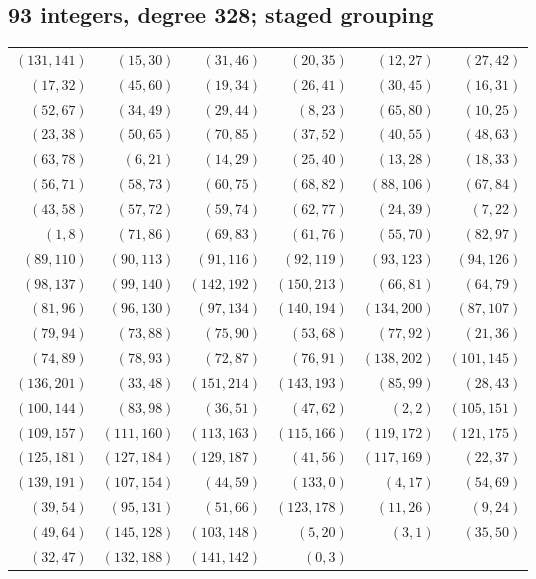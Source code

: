 \subsection*{93 integers, degree 328; staged grouping}
\begingroup\small
\begin{longtable}{rrrrrr}
$(131,141)$ & $(15,30)$ & $(31,46)$ & $(20,35)$ & $(12,27)$ & $(27,42)$\\
$(17,32)$ & $(45,60)$ & $(19,34)$ & $(26,41)$ & $(30,45)$ & $(16,31)$\\
$(52,67)$ & $(34,49)$ & $(29,44)$ & $(8,23)$ & $(65,80)$ & $(10,25)$\\
$(23,38)$ & $(50,65)$ & $(70,85)$ & $(37,52)$ & $(40,55)$ & $(48,63)$\\
$(63,78)$ & $(6,21)$ & $(14,29)$ & $(25,40)$ & $(13,28)$ & $(18,33)$\\
$(56,71)$ & $(58,73)$ & $(60,75)$ & $(68,82)$ & $(88,106)$ & $(67,84)$\\
$(43,58)$ & $(57,72)$ & $(59,74)$ & $(62,77)$ & $(24,39)$ & $(7,22)$\\
$(1,8)$ & $(71,86)$ & $(69,83)$ & $(61,76)$ & $(55,70)$ & $(82,97)$\\
$(89,110)$ & $(90,113)$ & $(91,116)$ & $(92,119)$ & $(93,123)$ & $(94,126)$\\
$(98,137)$ & $(99,140)$ & $(142,192)$ & $(150,213)$ & $(66,81)$ & $(64,79)$\\
$(81,96)$ & $(96,130)$ & $(97,134)$ & $(140,194)$ & $(134,200)$ & $(87,107)$\\
$(79,94)$ & $(73,88)$ & $(75,90)$ & $(53,68)$ & $(77,92)$ & $(21,36)$\\
$(74,89)$ & $(78,93)$ & $(72,87)$ & $(76,91)$ & $(138,202)$ & $(101,145)$\\
$(136,201)$ & $(33,48)$ & $(151,214)$ & $(143,193)$ & $(85,99)$ & $(28,43)$\\
$(100,144)$ & $(83,98)$ & $(36,51)$ & $(47,62)$ & $(2,2)$ & $(105,151)$\\
$(109,157)$ & $(111,160)$ & $(113,163)$ & $(115,166)$ & $(119,172)$ & $(121,175)$\\
$(125,181)$ & $(127,184)$ & $(129,187)$ & $(41,56)$ & $(117,169)$ & $(22,37)$\\
$(139,191)$ & $(107,154)$ & $(44,59)$ & $(133,0)$ & $(4,17)$ & $(54,69)$\\
$(39,54)$ & $(95,131)$ & $(51,66)$ & $(123,178)$ & $(11,26)$ & $(9,24)$\\
$(49,64)$ & $(145,128)$ & $(103,148)$ & $(5,20)$ & $(3,1)$ & $(35,50)$\\
$(32,47)$ & $(132,188)$ & $(141,142)$ & $(0,3)$ & &\\
\end{longtable}
\endgroup

